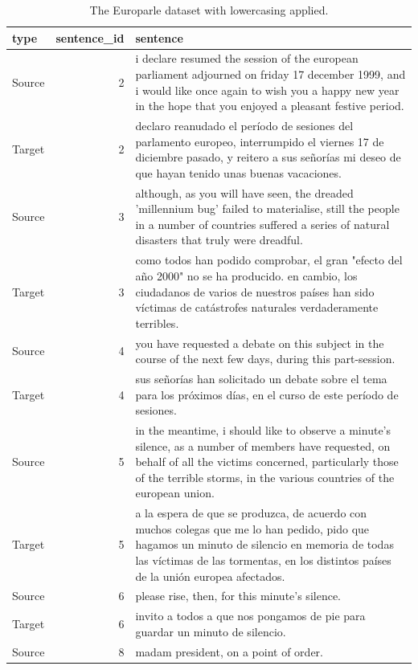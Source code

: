 \documentclass[
]{article}
\begin{document}
\begin{table}

\caption{\label{tab:normalize-lowercase-europarle}The Europarle dataset with lowercasing applied.}
\centering
\begin{tabular}[t]{lrl}
\toprule
type & sentence\_id & sentence\\
\midrule
Source & 2 & i declare resumed the session of the european parliament adjourned on friday 17 december 1999, and i would like once again to wish you a happy new year in the hope that you enjoyed a pleasant festive period.\\
Target & 2 & declaro reanudado el período de sesiones del parlamento europeo, interrumpido el viernes 17 de diciembre pasado, y reitero a sus señorías mi deseo de que hayan tenido unas buenas vacaciones.\\
Source & 3 & although, as you will have seen, the dreaded 'millennium bug' failed to materialise, still the people in a number of countries suffered a series of natural disasters that truly were dreadful.\\
Target & 3 & como todos han podido comprobar, el gran "efecto del año 2000" no se ha producido. en cambio, los ciudadanos de varios de nuestros países han sido víctimas de catástrofes naturales verdaderamente terribles.\\
Source & 4 & you have requested a debate on this subject in the course of the next few days, during this part-session.\\
\addlinespace
Target & 4 & sus señorías han solicitado un debate sobre el tema para los próximos días, en el curso de este período de sesiones.\\
Source & 5 & in the meantime, i should like to observe a minute's silence, as a number of members have requested, on behalf of all the victims concerned, particularly those of the terrible storms, in the various countries of the european union.\\
Target & 5 & a la espera de que se produzca, de acuerdo con muchos colegas que me lo han pedido, pido que hagamos un minuto de silencio en memoria de todas las víctimas de las tormentas, en los distintos países de la unión europea afectados.\\
Source & 6 & please rise, then, for this minute's silence.\\
Target & 6 & invito a todos a que nos pongamos de pie para guardar un minuto de silencio.\\
\addlinespace
Source & 8 & madam president, on a point of order.\\

\end{tabular}
\end{table}
\end{document}
